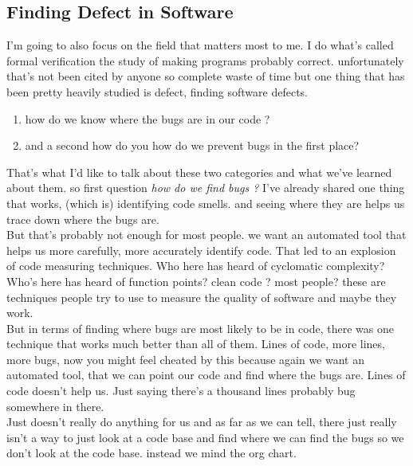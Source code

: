 \documentclass[conference, compsoc, twoside]{IEEEtran}
\begin{document}
\subsection{Finding Defect in Software} %
\label{sub:finding_defect_in_software}
I'm going to also focus on the field that matters
most to me. 
I do what's called formal verification the study of making
programs probably correct. 
unfortunately that's not been cited by anyone so
complete waste of time but one thing
that has been pretty heavily studied is
defect, finding software defects. 
\begin{enumerate}
	\item how do we know where the bugs are in our code ?
	\item and a second how do you how do we prevent bugs in the first place?
\end{enumerate}
That's what I'd like to talk about these two categories and what we've learned
about them.
so first question \textit{how do we find bugs ?}
I've already shared one thing that works, (which is) identifying code smells. and seeing where they are helps us trace down where the bugs are. \\
But that's probably not enough for most people.
we want an automated tool that helps us more carefully, more accurately identify code. 
That led to an explosion of code measuring techniques.
Who here has heard of cyclomatic complexity?
Who's here has heard of function points? clean code ? 
most people? 
these are techniques people try to use to measure the quality of
software and maybe they work. \\
But in terms of finding where bugs are most likely to be in code, there was one technique that works much better than all of them. 
Lines of code, more lines, more bugs, now you might feel cheated by this because again we want an automated tool, that we can point our code and find where the bugs are. 
Lines of code doesn't help us. Just saying there's a thousand lines probably bug somewhere in there.\\
Just doesn't really do anything for us and as far as we can tell,
there just really isn't a way to just look at a code base and find where we can find the bugs so we don't look at the code base. 
instead we mind the org chart. 
\end{document}
